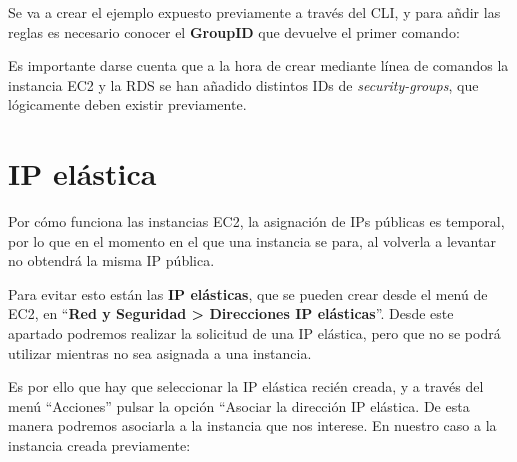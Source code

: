 \documentclass{\ClassPath/viu-tfm-template}
\begin{document}
Se va a crear el ejemplo expuesto previamente a través del CLI, y para añdir las reglas es necesario conocer el \textbf{GroupID} que devuelve el primer comando:


Es importante darse cuenta que a la hora de crear mediante línea de comandos la instancia EC2 y la RDS se han añadido distintos IDs de \textit{security-groups}, que lógicamente deben existir previamente.


\chapter{IP elástica}

Por cómo funciona las instancias EC2, la asignación de IPs públicas es temporal, por lo que en el momento en el que una instancia se para, al volverla a levantar no obtendrá la misma IP pública.

Para evitar esto están las \textbf{IP elásticas}, que se pueden crear desde el menú de EC2, en “\textbf{Red y Seguridad > Direcciones IP elásticas}”. Desde este apartado podremos realizar la solicitud de una IP elástica, pero que no se podrá utilizar mientras no sea asignada a una instancia.

Es por ello que hay que seleccionar la IP elástica recién creada, y a través del menú “Acciones” pulsar la opción “Asociar la dirección IP elástica. De esta manera podremos asociarla a la instancia que nos interese. En nuestro caso a la instancia creada previamente:
\end{document}
